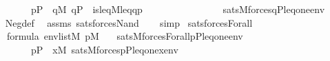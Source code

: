 \begin{isabellebody}
\ \ \ \ \ \ \ \ \ {\isacharparenleft}{\kern0pt}p{\isasymin}P\ {\isasymand}\ {\isasymnot}{\isacharparenleft}{\kern0pt}{\isasymexists}q{\isasymin}M{\isachardot}{\kern0pt}\ q{\isasymin}P\ {\isasymand}\ is{\isacharunderscore}{\kern0pt}leq{\isacharparenleft}{\kern0pt}{\isacharhash}{\kern0pt}{\isacharhash}{\kern0pt}M{\isacharcomma}{\kern0pt}leq{\isacharcomma}{\kern0pt}q{\isacharcomma}{\kern0pt}p{\isacharparenright}{\kern0pt}\ {\isasymand}\isanewline
\ \ \ \ \ \ \ \ \ \ \ \ \ \ \ {\isacharparenleft}{\kern0pt}sats{\isacharparenleft}{\kern0pt}M{\isacharcomma}{\kern0pt}forces{\isacharprime}{\kern0pt}{\isacharparenleft}{\kern0pt}{\isasymphi}{\isacharparenright}{\kern0pt}{\isacharcomma}{\kern0pt}{\isacharbrackleft}{\kern0pt}q{\isacharcomma}{\kern0pt}P{\isacharcomma}{\kern0pt}leq{\isacharcomma}{\kern0pt}one{\isacharbrackright}{\kern0pt}{\isacharat}{\kern0pt}env{\isacharparenright}{\kern0pt}{\isacharparenright}{\kern0pt}{\isacharparenright}{\kern0pt}{\isacharparenright}{\kern0pt}{\isachardoublequoteclose}\isanewline
%
\isadelimproof
\ \ %
\endisadelimproof
%
\isatagproof
{}\isamarkupfalse%
\ Neg{\isacharunderscore}{\kern0pt}def\ \isamarkupfalse%
\ assms\ sats{\isacharunderscore}{\kern0pt}forces{\isacharunderscore}{\kern0pt}Nand\isanewline
\ \ \isamarkupfalse%
\ simp%
\endisatagproof
{\isafoldproof}%
%
\isadelimproof
\isanewline
%
\endisadelimproof
\isanewline
{}\isamarkupfalse%
\ sats{\isacharunderscore}{\kern0pt}forces{\isacharunderscore}{\kern0pt}Forall\ {\isacharcolon}{\kern0pt}\isanewline
\ \ \ \ {\isachardoublequoteopen}{\isasymphi}{\isasymin}formula{\isachardoublequoteclose}\ {\isachardoublequoteopen}env{\isasymin}list{\isacharparenleft}{\kern0pt}M{\isacharparenright}{\kern0pt}{\isachardoublequoteclose}\ {\isachardoublequoteopen}p{\isasymin}M{\isachardoublequoteclose}\isanewline
\ \ \ {\isachardoublequoteopen}sats{\isacharparenleft}{\kern0pt}M{\isacharcomma}{\kern0pt}forces{\isacharparenleft}{\kern0pt}Forall{\isacharparenleft}{\kern0pt}{\isasymphi}{\isacharparenright}{\kern0pt}{\isacharparenright}{\kern0pt}{\isacharcomma}{\kern0pt}{\isacharbrackleft}{\kern0pt}p{\isacharcomma}{\kern0pt}P{\isacharcomma}{\kern0pt}leq{\isacharcomma}{\kern0pt}one{\isacharbrackright}{\kern0pt}{\isacharat}{\kern0pt}env{\isacharparenright}{\kern0pt}\ {\isasymlongleftrightarrow}\isanewline
\ \ \ \ \ \ \ \ \ p{\isasymin}P\ {\isasymand}\ {\isacharparenleft}{\kern0pt}{\isasymforall}x{\isasymin}M{\isachardot}{\kern0pt}\ sats{\isacharparenleft}{\kern0pt}M{\isacharcomma}{\kern0pt}forces{\isacharprime}{\kern0pt}{\isacharparenleft}{\kern0pt}{\isasymphi}{\isacharparenright}{\kern0pt}{\isacharcomma}{\kern0pt}{\isacharbrackleft}{\kern0pt}p{\isacharcomma}{\kern0pt}P{\isacharcomma}{\kern0pt}leq{\isacharcomma}{\kern0pt}one{\isacharcomma}{\kern0pt}x{\isacharbrackright}{\kern0pt}{\isacharat}{\kern0pt}env{\isacharparenright}{\kern0pt}{\isacharparenright}{\kern0pt}{\isachardoublequoteclose}\isanewline

\end{isabellebody}
